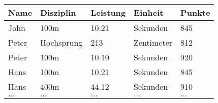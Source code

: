 \documentclass{bschlangaul-aufgabe}
\begin{document}
\begin{center}
\begin{tabular}{|l|l|l|l|l|}
\hline
Name    & Disziplin  & Leistung & Einheit    & Punkte \\\hline
John    & 100m       & 10.21    & Sekunden   & 845 \\
Peter   & Hochsprung & 213      & Zentimeter & 812 \\
Peter   & 100m       & 10.10    & Sekunden   & 920 \\
Hans    & 100m       & 10.21    & Sekunden   & 845 \\
Hans    & 400m       & 44.12    & Sekunden   & 910 \\
$\dots$ & $\dots$    & $\dots$  & $\dots$    & $\dots$ \\
\end{tabular}
\end{center}
\end{document}
